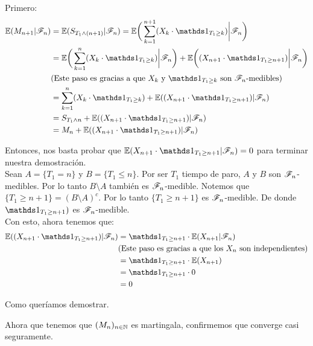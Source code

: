 \begin{itemize}
			Primero:
			\begin{align}
				\E(M_{n+1} | \F_{n}) &= \E( S_{T_1 \wedge (n+1)} | \F_{n}) = 
				\E\bigg( \sum_{k=1}^{n+1} (X_k \cdot \indic_{T_1 \geq k})\bigg| \F_{n}\bigg) \\	 			
				& =\E\bigg( \sum_{k=1}^{n} (X_k \cdot \indic_{T_1 \geq k}) \bigg| \F_{n}\bigg) +
				\E\bigg((X_{n+1} \cdot \indic_{T_1 \geq n+1}) \bigg| \F_{n}\bigg) \\
				&\mbox{(Este paso es gracias a que $X_k$ y $\indic_{T_1 \geq k}$ son $\F_n$-medibles)}\\
				& = \sum_{k=1}^{n} (X_k \cdot \indic_{T_1 \geq k}) + 
				\E((X_{n+1} \cdot \indic_{T_1 \geq n+1}) | \F_{n}) \\
				& = S_{T_1 \wedge n} + \E((X_{n+1} \cdot \indic_{T_1 \geq n+1}) | \F_{n}) \\
				& = M_n + \E((X_{n+1} \cdot \indic_{T_1 \geq n+1}) | \F_{n})
			\end{align}
			
			Entonces, nos basta probar que $\E(X_{n+1} \cdot \indic_{T_1 \geq n+1} |
			 \F_{n}) = 0$ para terminar nuestra demostración.\\
			 
			Sean $A = \{T_1 = n\}$ y $B = \{ T_1 \leq n\}$. Por ser $T_1$ tiempo de paro,
			$A$ y $B$ son $\mathscr{F}_n$-medibles. Por lo tanto $B \setminus A$ también es $\mathscr{F}_n$-medible. 
			Notemos que $\{T_1 \geq n+1\} = (B \setminus A)^c$. Por lo tanto $\{T_1 \geq n+1\}$ es
			$\mathscr{F}_n$-medible. De donde  $\indic_{T_1 \geq n+1})$ es $\mathscr{F}_n$-medible.\\
			
			Con esto, ahora tenemos que:
			\begin{align}
				\E((X_{n+1} \cdot \indic_{T_1 \geq n+1}) | \F_{n}) &= \indic_{T_1 \geq n+1} \cdot \E(X_{n+1} | \F_{n}) \\
				&\mbox{(Este paso es gracias a que los $X_n$ son independientes)} \\
				&=\indic_{T_1 \geq n+1} \cdot \E(X_{n+1} ) \\
				&=\indic_{T_1 \geq n+1} \cdot 0 \\
				&= 0
			\end{align}	
			
			Como queríamos demostrar.
	\end{itemize}
	
	Ahora que tenemos que $(M_n)_{n \in \mathbb{N}}$ es martingala, confirmemos que converge casi seguramente.\\
	

